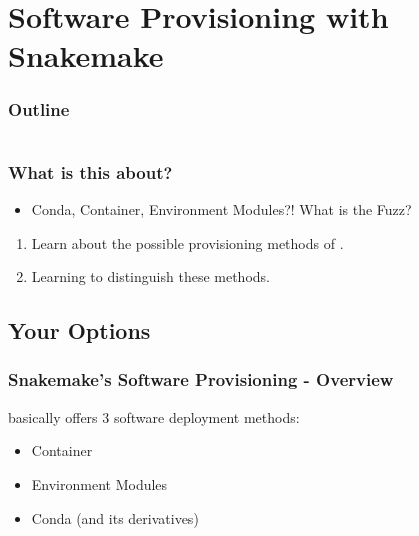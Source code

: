 \section{Software Provisioning with Snakemake}

\begin{frame}
	\frametitle{Outline}
	\begin{columns}[t]
		\begin{column}{.5\textwidth}
			\tableofcontents[sections={1-7},currentsection]
		\end{column}
		\begin{column}{.5\textwidth}
			\tableofcontents[sections={8-15},currentsection]
		\end{column}
	\end{columns}
\end{frame}

\begin{frame}
	\frametitle{What is this about?}
	\begin{question}[Questions]
		\begin{itemize}
			\item Conda, Container, Environment Modules?! What is the Fuzz?
		\end{itemize}
	\end{question}
	\begin{docs}[Objectives]
		\begin{enumerate}
			\item Learn about the possible provisioning methods of \Snakemake.
			\item Learning to distinguish these methods.
		\end{enumerate}
	\end{docs}
\end{frame}

\subsection{Your Options}

\begin{frame}
  \frametitle{Snakemake's Software Provisioning - Overview}
  \Snakemake{} basically offers 3 software deployment methods:
  \begin{itemize}[<+->]
    \item Container
    \item Environment Modules
    \item Conda (and its derivatives)
  \end{itemize}
\end{frame}

